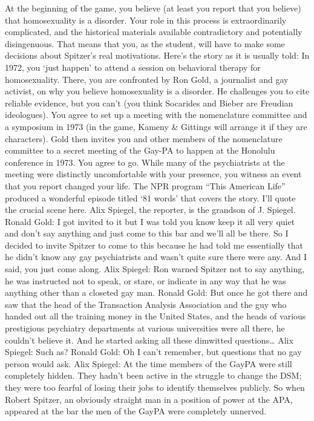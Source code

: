 At the beginning of the game, you believe (at least you report that you believe) that homosexuality is a disorder.
Your role in this process is extraordinarily complicated, and the historical materials available contradictory and potentially disingenuous. That means that you, as the student, will have to make some decisions about Spitzer's real motivations. Here's the story as it is usually told:
 In 1972, you `just happen' to attend a session on behavioral therapy for homosexuality. There, you are confronted by Ron Gold, a journalist and gay activist, on why you believe homosexuality is a disorder. He challenges you to cite reliable evidence, but you can't (you think Socarides and Bieber are Freudian ideologues). You agree to set up a meeting with the nomenclature committee and a symposium in 1973 (in the game, Kameny \& Gittings will arrange it if they are characters). Gold then invites you and other members of the nomenclature committee to a secret meeting of the Gay-PA to happen at the Honolulu conference in 1973. You agree to go. While many of the psychiatrists at the meeting were distinctly uncomfortable with your presence, you witness an event that you report changed your life. The NPR program “This American Life” produced a wonderful episode titled `81 words' that covers the story. I'll quote the crucial scene here. Alix Spiegel, the reporter, is the grandson of J. Spiegel.
Ronald Gold: I got invited to it but I was told you know keep it all very quiet and don't say anything and just come to this bar and we'll all be there. So I decided to invite Spitzer to come to this because he had told me essentially that he didn't know any gay psychiatrists and wasn't quite sure there were any. And I said, you just come along.
Alix Spiegel: Ron warned Spitzer not to say anything, he was instructed not to speak, or stare, or indicate in any way that he was anything other than a closeted gay man.
Ronald Gold: But once he got there and saw that the head of the Transaction Analysis Association and the guy who handed out all the training money in the United States, and the heads of various prestigious psychiatry departments at various universities were all there, he couldn't believe it. And he started asking all these dimwitted questions{\ldots}
Alix Spiegel: Such as?
Ronald Gold: Oh I can't remember, but questions that no gay person would ask.
Alix Spiegel: At the time members of the GayPA were still completely hidden. They hadn't been active in the struggle to change the DSM; they were too fearful of losing their jobs to identify themselves publicly. So when Robert Spitzer, an obviously straight man in a position of power at the APA, appeared at the bar the men of the GayPA were completely unnerved.
